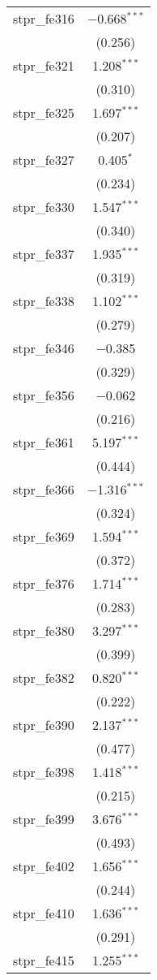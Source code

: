 \begin{table}[!htbp]
\begin{tabular}{@{\extracolsep{5pt}}lc}
  stpr\_fe316 & $-$0.668$^{***}$ \\ 
  & (0.256) \\ 
  stpr\_fe321 & 1.208$^{***}$ \\ 
  & (0.310) \\ 
  stpr\_fe325 & 1.697$^{***}$ \\ 
  & (0.207) \\ 
  stpr\_fe327 & 0.405$^{*}$ \\ 
  & (0.234) \\ 
  stpr\_fe330 & 1.547$^{***}$ \\ 
  & (0.340) \\ 
  stpr\_fe337 & 1.935$^{***}$ \\ 
  & (0.319) \\ 
  stpr\_fe338 & 1.102$^{***}$ \\ 
  & (0.279) \\ 
  stpr\_fe346 & $-$0.385 \\ 
  & (0.329) \\ 
  stpr\_fe356 & $-$0.062 \\ 
  & (0.216) \\ 
  stpr\_fe361 & 5.197$^{***}$ \\ 
  & (0.444) \\ 
  stpr\_fe366 & $-$1.316$^{***}$ \\ 
  & (0.324) \\ 
  stpr\_fe369 & 1.594$^{***}$ \\ 
  & (0.372) \\ 
  stpr\_fe376 & 1.714$^{***}$ \\ 
  & (0.283) \\ 
  stpr\_fe380 & 3.297$^{***}$ \\ 
  & (0.399) \\ 
  stpr\_fe382 & 0.820$^{***}$ \\ 
  & (0.222) \\ 
  stpr\_fe390 & 2.137$^{***}$ \\ 
  & (0.477) \\ 
  stpr\_fe398 & 1.418$^{***}$ \\ 
  & (0.215) \\ 
  stpr\_fe399 & 3.676$^{***}$ \\ 
  & (0.493) \\ 
  stpr\_fe402 & 1.656$^{***}$ \\ 
  & (0.244) \\ 
  stpr\_fe410 & 1.636$^{***}$ \\ 
  & (0.291) \\ 
  stpr\_fe415 & 1.255$^{***}$ \\ 

\end{tabular}
\end{table}
